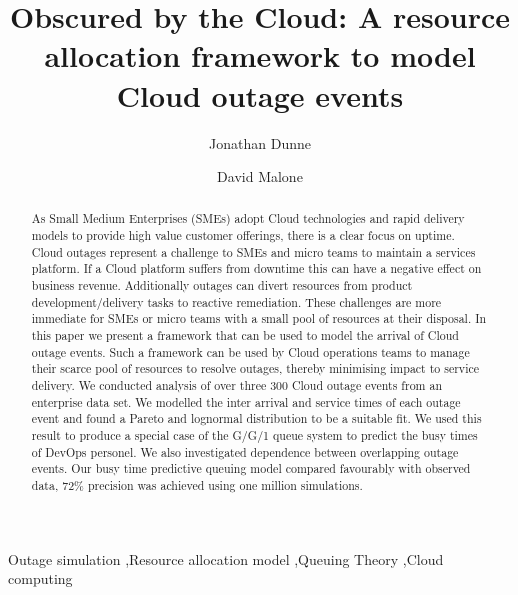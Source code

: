\documentclass[5p]{elsarticle}
\begin{document}
\begin{frontmatter}

\title{Obscured by the Cloud: A resource allocation framework to model Cloud outage events}


\author[mymainaddress]{Jonathan Dunne}

\author[mymainaddress]{David Malone}

\address[mymainaddress]{Hamilton Institute, Maynooth University, Kildare, Ireland}

\begin{abstract}
As Small Medium Enterprises (SMEs) adopt Cloud technologies and rapid delivery models to provide high value customer offerings, there is a clear focus on uptime. Cloud outages represent a challenge to SMEs and micro teams to maintain a services platform. If a Cloud platform suffers from downtime this can have a negative effect on business revenue. Additionally outages can divert resources from product development/delivery tasks to reactive remediation. These challenges are more immediate for SMEs or micro teams with a small pool of resources at their disposal. In this paper we present a framework that can be used to model the arrival of Cloud outage events. Such a framework can be used by Cloud operations teams to manage their scarce pool of resources to resolve outages, thereby minimising impact to service delivery. We conducted analysis of over three 300 Cloud outage events from an enterprise data set. We modelled the inter arrival and service times of each outage event and found a Pareto and lognormal distribution to be a suitable fit. We used this result to produce a special case of the G/G/1 queue system to predict the busy times of DevOps personel. We also investigated dependence between overlapping outage events. Our busy time predictive queuing model compared favourably with observed data, 72\% precision was achieved using one million simulations. 

\end{abstract}

\begin{keyword}
Outage simulation \sep Resource allocation model \sep Queuing Theory \sep Cloud computing
\end{keyword}

\end{frontmatter}
\end{document}
